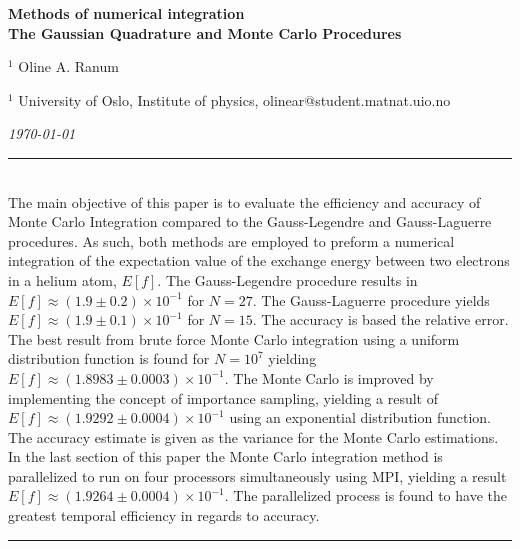 \documentclass[%
reprint,
amsmath,amssymb,
aps,
]{revtex4-1}
\newcommand{\HRule}{\rule{\textwidth}{0.5mm}}
\begin{document}
\onecolumngrid

\begin{center}
	\large\textbf{Methods of numerical integration\\ \small{The Gaussian Quadrature and Monte Carlo Procedures}}
\end{center}
\vspace{5mm}

\begin{center}
	\small{$^1$ Oline A. Ranum}\\
\end{center}

\begin{center}
	\small{$^1$ University of Oslo, Institute of physics, 
		olinear@student.matnat.uio.no}
\end{center}

\begin{center}
	\textit{\today}
\end{center}
\vspace{7mm}
\noindent 
\HRule \vspace{2mm}\\
The main objective of this paper is to evaluate the efficiency and accuracy of Monte Carlo Integration compared to the Gauss-Legendre and Gauss-Laguerre procedures. As such, both methods are employed to preform a numerical integration of the expectation value of the exchange energy between two electrons in a helium atom, $E[f]$. The Gauss-Legendre procedure results in $E[f] \approx (1.9 \pm 0.2)\times 10^{-1}$ for $N=27$. The Gauss-Laguerre procedure yields $E[f]\approx (1.9 \pm 0.1)\times 10^{-1}$ for $N=15$. The accuracy is based the relative error. The best result from brute force Monte Carlo integration using a uniform distribution function is found for $N=10^7$ yielding $E[f]\approx (1.8983 \pm 0.0003)\times 10^{-1}$. The Monte Carlo is improved by implementing the concept of importance sampling, yielding a result of $E[f]\approx (1.9292 \pm 0.0004)\times 10^{-1}$ using an exponential distribution function. The accuracy estimate is given as the variance for the Monte Carlo estimations. In the last section of this paper the Monte Carlo integration method is parallelized to run on four processors simultaneously using MPI, yielding a result $E[f]\approx (1.9264 \pm 0.0004)\times 10^{-1}$. The parallelized process is found to have the greatest temporal efficiency in regards to accuracy. 
\vspace{2mm}  \\
\HRule
\vspace{1.4cm}
\end{document}
